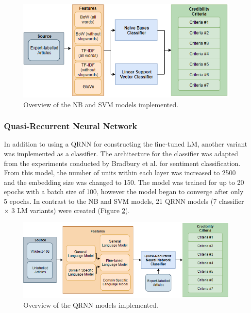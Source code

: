 \documentclass[a4paper,twoside,phd]{BYUPhys}
\begin{document}
\begin{figure}[H]
	\centering
	\includegraphics[totalheight=6cm]{images/ml-models.png}
	\caption{Overview of the NB and SVM models implemented.}
	\label{fig:MLModels}
\end{figure}

\subsubsection{Quasi-Recurrent Neural Network}
\label{sec:ModelQRNN}

In addition to using a QRNN for constructing the fine-tuned LM, another variant was implemented as a classifier. The architecture for the classifier was adapted from the experiments conducted by Bradbury et al. \cite{bradbury2016quasi} for sentiment classification. From this model, the number of units within each layer was increased to 2500 and the embedding size was changed to 150. The model was trained for up to 20 epochs with a batch size of 100, however the model began to converge after only 5 epochs. In contrast to the NB and SVM models, 21 QRNN models (7 classifier $\times$ 3 LM variants) were created (Figure \ref{fig:DLModels}).

\begin{figure}[H]
	\centering
	\includegraphics[totalheight=6cm]{images/dl-models.png}
	\caption{Overview of the QRNN models implemented.}
	\label{fig:DLModels}
\end{figure}
\end{document}
